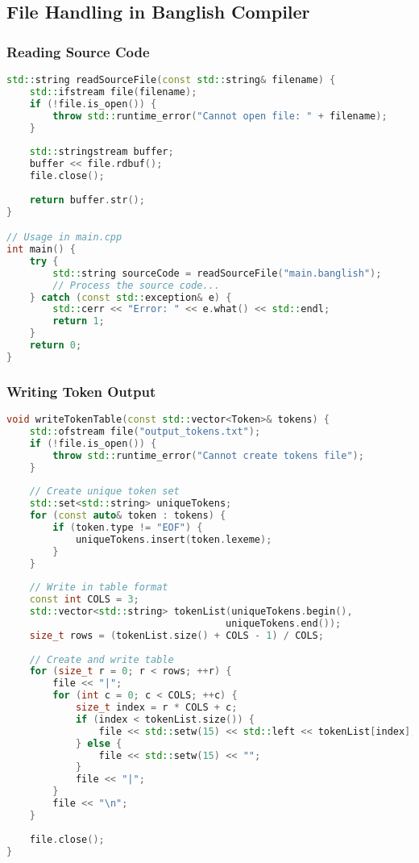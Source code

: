 \documentclass[12pt,a4paper]{article}
\begin{document}
\subsection{File Handling in Banglish Compiler}

\subsubsection{Reading Source Code}

\begin{lstlisting}[language=C++, caption=Reading Banglish Source File]
std::string readSourceFile(const std::string& filename) {
    std::ifstream file(filename);
    if (!file.is_open()) {
        throw std::runtime_error("Cannot open file: " + filename);
    }
    
    std::stringstream buffer;
    buffer << file.rdbuf();
    file.close();
    
    return buffer.str();
}

// Usage in main.cpp
int main() {
    try {
        std::string sourceCode = readSourceFile("main.banglish");
        // Process the source code...
    } catch (const std::exception& e) {
        std::cerr << "Error: " << e.what() << std::endl;
        return 1;
    }
    return 0;
}
\end{lstlisting}

\subsubsection{Writing Token Output}

\begin{lstlisting}[language=C++, caption=Writing Token Table to File]
void writeTokenTable(const std::vector<Token>& tokens) {
    std::ofstream file("output_tokens.txt");
    if (!file.is_open()) {
        throw std::runtime_error("Cannot create tokens file");
    }
    
    // Create unique token set
    std::set<std::string> uniqueTokens;
    for (const auto& token : tokens) {
        if (token.type != "EOF") {
            uniqueTokens.insert(token.lexeme);
        }
    }
    
    // Write in table format
    const int COLS = 3;
    std::vector<std::string> tokenList(uniqueTokens.begin(), 
                                      uniqueTokens.end());
    size_t rows = (tokenList.size() + COLS - 1) / COLS;
    
    // Create and write table
    for (size_t r = 0; r < rows; ++r) {
        file << "|";
        for (int c = 0; c < COLS; ++c) {
            size_t index = r * COLS + c;
            if (index < tokenList.size()) {
                file << std::setw(15) << std::left << tokenList[index];
            } else {
                file << std::setw(15) << "";
            }
            file << "|";
        }
        file << "\n";
    }
    
    file.close();
}
\end{lstlisting}
\end{document}
